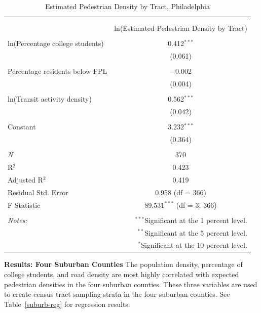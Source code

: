 \documentclass[paper=letterpaper, fontsize=11pt]{scrartcl}
\begin{document}
\begin{table}[!htbp] \centering 
	\caption{Estimated Pedestrian Density by Tract, Philadelphia} 
	\label{} 
	\begin{tabular}{@{\extracolsep{5pt}}lc} 
		\\[-1.8ex]\hline 
		\hline \\[-1.8ex] 
		\\[-1.8ex] & ln(Estimated Pedestrian Density by Tract) \\ 
		\hline \\[-1.8ex] 
		ln(Percentage college students) & 0.412$^{***}$ \\ 
		& (0.061) \\ 
		& \\ 
		Percentage residents below FPL & $-$0.002 \\ 
		& (0.004) \\ 
		& \\ 
		ln(Transit activity density) & 0.562$^{***}$ \\ 
		& (0.042) \\ 
		& \\ 
		Constant & 3.232$^{***}$ \\ 
		& (0.364) \\ 
		& \\ 
		\textit{N} & 370 \\ 
		R$^{2}$ & 0.423 \\ 
		Adjusted R$^{2}$ & 0.419 \\ 
		Residual Std. Error & 0.958 (df = 366) \\ 
		F Statistic & 89.531$^{***}$ (df = 3; 366) \\ 
		\hline 
		\hline \\[-1.8ex] 
		\textit{Notes:} & \multicolumn{1}{r}{$^{***}$Significant at the 1 percent level.} \\ 
		& \multicolumn{1}{r}{$^{**}$Significant at the 5 percent level.} \\ 
		& \multicolumn{1}{r}{$^{*}$Significant at the 10 percent level.} \\ 
	\end{tabular} 
\end{table} 

\textbf{Results: Four Suburban Counties}
The population density, percentage of college students, and road density are most highly correlated with expected pedestrian densities in the four suburban counties. These three variables are used to create census tract sampling strata in the four suburban counties. See Table~\ref{suburb-reg} for regression results.
\end{document}
